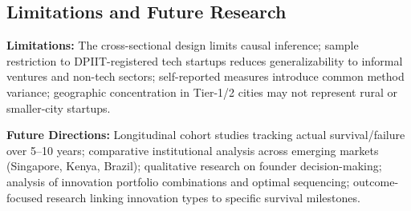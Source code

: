 \documentclass{ieeeaccess}
\begin{document}
\subsection{Limitations and Future Research}

\textbf{Limitations:} The cross-sectional design limits causal inference; sample restriction to DPIIT-registered tech startups reduces generalizability to informal ventures and non-tech sectors; self-reported measures introduce common method variance; geographic concentration in Tier-1/2 cities may not represent rural or smaller-city startups.

\textbf{Future Directions:} Longitudinal cohort studies tracking actual survival/failure over 5--10 years; comparative institutional analysis across emerging markets (Singapore, Kenya, Brazil); qualitative research on founder decision-making; analysis of innovation portfolio combinations and optimal sequencing; outcome-focused research linking innovation types to specific survival milestones.
\end{document}
